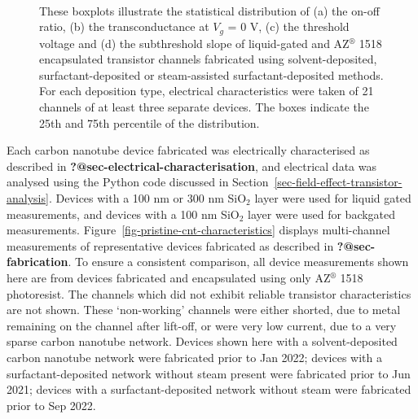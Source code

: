 \documentclass[
  a4paper,
]{scrbook}
\begin{document}
\begin{figure}
\begin{minipage}[t]{0.01\linewidth}
{~

}

\end{minipage}%

\caption{\label{fig-sweep-parameters}These boxplots illustrate the
statistical distribution of (a) the on-off ratio, (b) the
transconductance at \(V_g\) = 0 V, (c) the threshold voltage and (d) the
subthreshold slope of liquid-gated and AZ\(^\circledR\) 1518
encapsulated transistor channels fabricated using solvent-deposited,
surfactant-deposited or steam-assisted surfactant-deposited methods. For
each deposition type, electrical characteristics were taken of 21
channels of at least three separate devices. The boxes indicate the 25th
and 75th percentile of the distribution.}

\end{figure}

Each carbon nanotube device fabricated was electrically characterised as
described in \textbf{?@sec-electrical-characterisation}, and electrical
data was analysed using the Python code discussed in
Section~\ref{sec-field-effect-transistor-analysis}. Devices with a 100
nm or 300 nm SiO\(_2\) layer were used for liquid gated measurements,
and devices with a 100 nm SiO\(_2\) layer were used for backgated
measurements. Figure~\ref{fig-pristine-cnt-characteristics} displays
multi-channel measurements of representative devices fabricated as
described in \textbf{?@sec-fabrication}. To ensure a consistent
comparison, all device measurements shown here are from devices
fabricated and encapsulated using only AZ\(^\circledR\) 1518
photoresist. The channels which did not exhibit reliable transistor
characteristics are not shown. These `non-working' channels were either
shorted, due to metal remaining on the channel after lift-off, or were
very low current, due to a very sparse carbon nanotube network. Devices
shown here with a solvent-deposited carbon nanotube network were
fabricated prior to Jan 2022; devices with a surfactant-deposited
network without steam present were fabricated prior to Jun 2021; devices
with a surfactant-deposited network without steam were fabricated prior
to Sep 2022.
\end{document}
